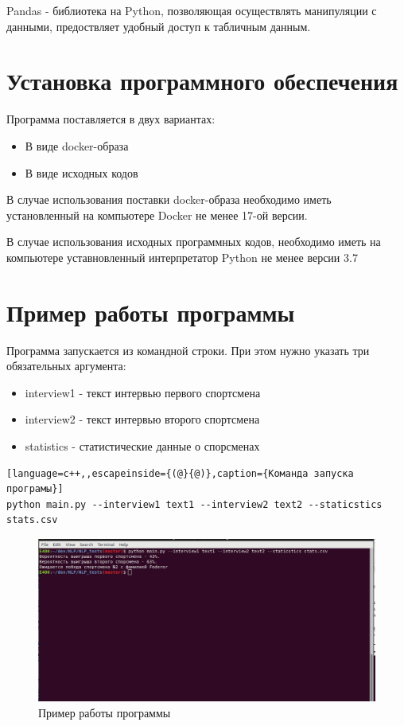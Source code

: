 Pandas - библиотека на Python, позволяющая осуществлять манипуляции с данными, предоствляет удобный доступ к табличным данным.
\section{Установка программного обеспечения}
Программа поставляется в двух вариантах:
\begin{itemize}
	\item В виде docker-образа
	\item В виде исходных кодов
\end{itemize}
В случае использования поставки docker-образа необходимо иметь установленный на компьютере Docker не менее 17-ой версии.

В случае использования исходных программных кодов, необходимо иметь на компьютере уставновленный интерпретатор Python не менее версии 3.7


\section{Пример работы программы}
Программа запускается из командной строки. При этом нужно указать три обязательных аргумента:
\begin{itemize}
	\item interview1 - текст интервью первого спортсмена
	\item interview2 - текст интервью второго спортсмена
	\item statistics - статистические данные о спорсменах
\end{itemize}

\begin{lstlisting}[language=c++,,escapeinside={(@}{@)},caption={Команда запуска програмы}] 
python main.py --interview1 text1 --interview2 text2 --staticstics stats.csv
\end{lstlisting}
\begin{figure}[!h]
	\centering
	\includegraphics[scale=0.5]{master_img/sample_program.png}
	\caption{Пример работы программы}
	\label{fig10}
\end{figure}
